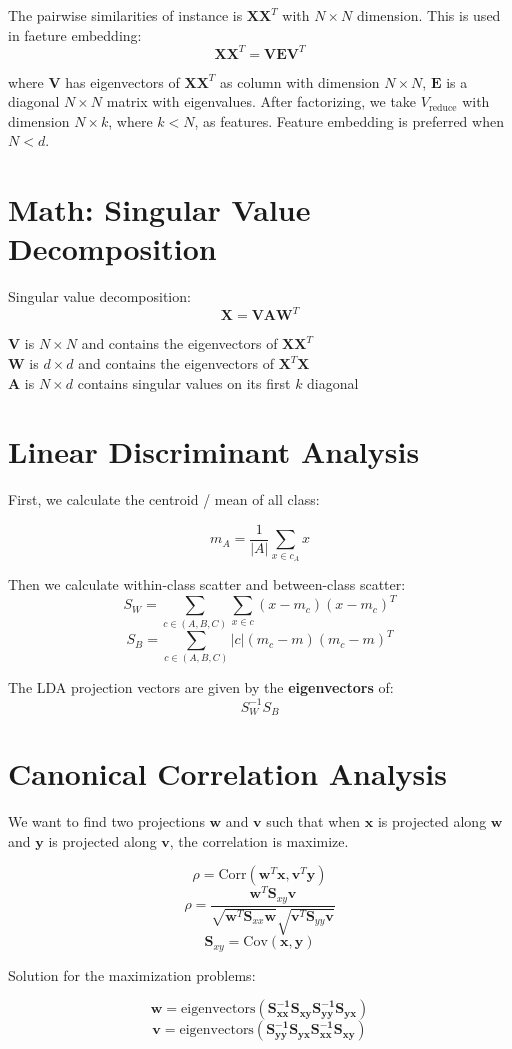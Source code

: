 \begin{multicols*}{2}
\noindent The pairwise similarities of instance is $\mathbf{X} \mathbf{X}^{T}$ with $N\times N$ dimension. This is used in faeture embedding:
$$\mathbf{X} \mathbf{X}^{T} = \mathbf{VEV}^{T}$$

\noindent where $\mathbf{V}$ has eigenvectors of $\mathbf{X} \mathbf{X}^{T}$ as column with dimension $N\times N$, $\mathbf{E}$ is a diagonal $N\times N$ matrix with eigenvalues. After factorizing, we take $V_{\text{reduce}}$ with dimension $N\times k$, where $k<N$, as features. Feature embedding is preferred when $N<d$. 

\section{Math: Singular Value Decomposition}
\noindent Singular value decomposition:
$$\mathbf{X} = \mathbf{VAW}^{T}$$

\noindent $\mathbf{V}$ is $N\times N$ and contains the eigenvectors of $\mathbf{XX}^T$ \\
\noindent $\mathbf{W}$ is $d\times d$ and contains the eigenvectors of $\mathbf{X}^T \mathbf{X}$ \\
\noindent $\mathbf{A}$ is $N\times d$ contains singular values on its first $k$ diagonal

\section{Linear Discriminant Analysis}

\noindent First, we calculate the centroid / mean of all class:

$$m_A = \frac{1}{|A|} \sum_{x \in c_A} x$$

\noindent Then we calculate within-class scatter and between-class scatter:
$$S_W = \sum_{c \in (A,B,C)} \sum_{x \in c} (x-m_c)(x-m_c)^{T}$$
$$S_B = \sum_{c \in (A,B,C)} |c| (m_c - m)(m_c - m)^T$$

\noindent The LDA projection vectors are given by the \textbf{eigenvectors} of:
$$S_W^{-1}S_B$$

\section{Canonical Correlation Analysis}

\noindent We want to find two projections $\mathbf{w}$ and $\mathbf{v}$ such that when $\mathbf{x}$ is projected along $\mathbf{w}$ and $\mathbf{y}$ is projected along $\mathbf{v}$, the correlation is maximize. 

$$\rho = \text{Corr}(\mathbf{w}^T \mathbf{x}, \mathbf{v}^T \mathbf{y})$$
$$\rho = \frac{\mathbf{w}^T\mathbf{S}_{xy}\mathbf{v}}{\sqrt{\mathbf{w}^T\mathbf{S}_{xx}\mathbf{w}}\sqrt{\mathbf{v}^T\mathbf{S}_{yy}\mathbf{v}}}$$
$$\mathbf{S}_{xy} = \text{Cov}(\mathbf{x},\mathbf{y})$$

\noindent Solution for the maximization problems:

$$\mathbf{w} = \text{eigenvectors}(\mathbf{S_{xx}^{-1}S_{xy}S_{yy}^{-1}S_{yx}})$$
$$\mathbf{v} = \text{eigenvectors}(\mathbf{S_{yy}^{-1}S_{yx}S_{xx}^{-1}S_{xy}})$$

\end{multicols*}
